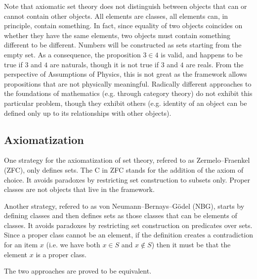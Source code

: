 \documentclass{bareminimum}
\begin{document}
Note that axiomatic set theory does not distinguish between objects that can or cannot contain other objects. All elements are classes, all elements can, in principle, contain something. In fact, since equality of two objects coincides on whether they have the same elements, two objects must contain something different to be different. Numbers will be constructed as sets starting from the empty set. As a consequence, the proposition $3 \in 4$ is valid, and happens to be true if $3$ and $4$ are naturals, though it is not true if $3$ and $4$ are reals. From the perspective of Assumptions of Physics, this is not great as the framework allows propositions that are not physically meaningful. Radically different approaches to the foundations of mathematics (e.g. through category theory) do not exhibit this particular problem, though they exhibit others (e.g. identity of an object can be defined only up to its relationships with other objects).

\subsection{Axiomatization}

One strategy for the axiomatization of set theory, refered to as Zermelo–Fraenkel (ZFC), only defines sets. The C in ZFC stands for the addition of the axiom of choice. It avoids paradoxes by restricting set construction to subsets only. Proper classes are not objects that live in the framework.

Another strategy, refered to as von Neumann–Bernays–Gödel (NBG), starts by defining classes and then defines sets as those classes that can be elements of classes. It avoids paradoxes by restricting set construction on predicates over sets. Since a proper class cannot be an element, if the definition creates a contradiction for an item $x$ (i.e. we have both $x \in S$ and $x \notin S$) then it must be that the element $x$ is a proper class.

The two approaches are proved to be equivalent.
\end{document}
